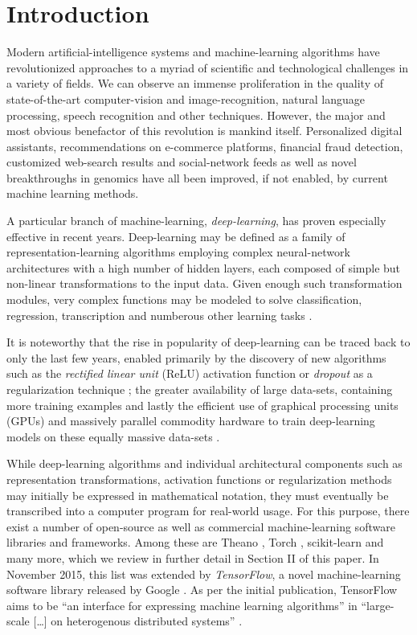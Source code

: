 \section{Introduction}

Modern artificial-intelligence systems and machine-learning algorithms have
revolutionized approaches to a myriad of scientific and technological challenges
in a variety of fields. We can observe an immense proliferation in the quality
of state-of-the-art computer-vision and image-recognition, natural language
processing, speech recognition and other techniques. However, the major and most
obvious benefactor of this revolution is mankind itself. Personalized digital
assistants, recommendations on e-commerce platforms, financial fraud detection,
customized web-search results and social-network feeds as well as novel
breakthroughs in genomics have all been improved, if not enabled, by current
machine learning methods.

A particular branch of machine-learning, \emph{deep-learning}, has proven
especially effective in recent years. Deep-learning may be defined as a family
of representation-learning algorithms employing complex neural-network
architectures with a high number of hidden layers, each composed of simple but
non-linear transformations to the input data. Given enough such transformation
modules, very complex functions may be modeled to solve classification,
regression, transcription and numberous other learning tasks \cite{nature2015}.

It is noteworthy that the rise in popularity of deep-learning can be traced back
to only the last few years, enabled primarily by the discovery of new algorithms
such as the \emph{rectified linear unit} (ReLU) \cite{relu} activation function
or \emph{dropout} as a regularization technique \cite{dropout}; the greater
availability of large data-sets, containing more training examples and lastly
the efficient use of graphical processing units (GPUs) and massively parallel
commodity hardware to train deep-learning models on these equally massive
data-sets \cite{nature2015, rampasek}.

While deep-learning algorithms and individual architectural components such as
representation transformations, activation functions or regularization methods
may initially be expressed in mathematical notation, they must eventually be
transcribed into a computer program for real-world usage. For this purpose,
there exist a number of open-source as well as commercial machine-learning
software libraries and frameworks. Among these are Theano \cite{theano}, Torch
\cite{torch}, scikit-learn \cite{scikit} and many more, which we review in
further detail in Section II of this paper. In November 2015, this list was
extended by \emph{TensorFlow}, a novel machine-learning software library
released by Google \cite{tensorflow}. As per the initial publication, TensorFlow
aims to be ``an interface for expressing machine learning algorithms'' in
``large-scale [\dots] on heterogenous distributed systems'' \cite{tensorflow}.

